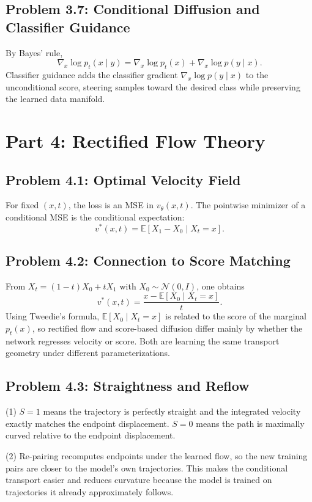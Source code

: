 \documentclass[11pt]{article}
\begin{document}
\subsection*{Problem 3.7: Conditional Diffusion and Classifier Guidance}
By Bayes' rule,
\[
\nabla_x \log p_t(x\mid y)=\nabla_x \log p_t(x)+\nabla_x \log p(y\mid x).
\]
Classifier guidance adds the classifier gradient $\nabla_x\log p(y\mid x)$ to the unconditional score, steering samples toward the desired class while preserving the learned data manifold.

\section{Part 4: Rectified Flow Theory}

\subsection*{Problem 4.1: Optimal Velocity Field}
For fixed $(x,t)$, the loss is an MSE in $v_\theta(x,t)$. The pointwise minimizer of a conditional MSE is the conditional expectation:
\[
v^*(x,t)=\mathbb E[X_1-X_0\mid X_t=x].
\]

\subsection*{Problem 4.2: Connection to Score Matching}
From $X_t=(1-t)X_0+tX_1$ with $X_0\sim\mathcal N(0,I)$, one obtains
\[
v^*(x,t)=\frac{x-\mathbb E[X_0\mid X_t=x]}{t}.
\]
Using Tweedie's formula, $\mathbb E[X_0\mid X_t=x]$ is related to the score of the marginal $p_t(x)$, so rectified flow and score-based diffusion differ mainly by whether the network regresses velocity or score. Both are learning the same transport geometry under different parameterizations.

\subsection*{Problem 4.3: Straightness and Reflow}
(1) $S=1$ means the trajectory is perfectly straight and the integrated velocity exactly matches the endpoint displacement. $S=0$ means the path is maximally curved relative to the endpoint displacement.

(2) Re-pairing recomputes endpoints under the learned flow, so the new training pairs are closer to the model's own trajectories. This makes the conditional transport easier and reduces curvature because the model is trained on trajectories it already approximately follows.
\end{document}
